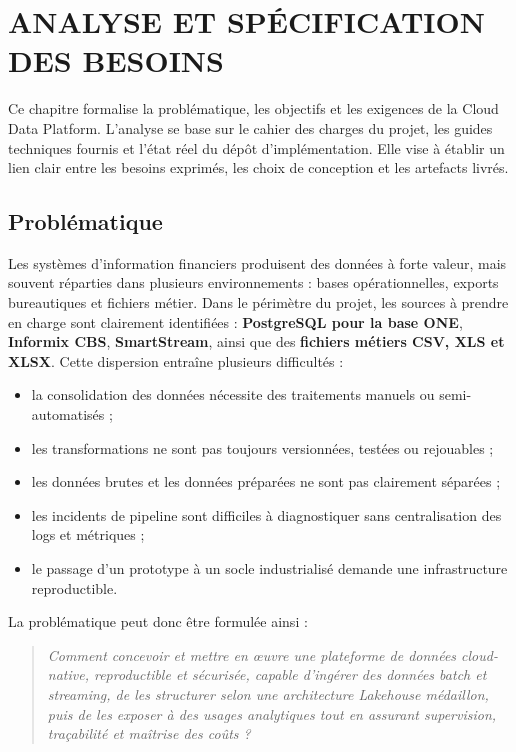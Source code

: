 \chapter{ANALYSE ET SPÉCIFICATION DES BESOINS}
\label{ch:besoins}

Ce chapitre formalise la problématique, les objectifs et les exigences de la Cloud Data Platform. L'analyse se base sur le cahier des charges du projet, les guides techniques fournis et l'état réel du dépôt d'implémentation. Elle vise à établir un lien clair entre les besoins exprimés, les choix de conception et les artefacts livrés.

\section{Problématique}

Les systèmes d'information financiers produisent des données à forte valeur, mais souvent réparties dans plusieurs environnements : bases opérationnelles, exports bureautiques et fichiers métier. Dans le périmètre du projet, les sources à prendre en charge sont clairement identifiées : \textbf{PostgreSQL pour la base ONE}, \textbf{Informix CBS}, \textbf{SmartStream}, ainsi que des \textbf{fichiers métiers CSV, XLS et XLSX}. Cette dispersion entraîne plusieurs difficultés :
\begin{itemize}
    \item la consolidation des données nécessite des traitements manuels ou semi-automatisés ;
    \item les transformations ne sont pas toujours versionnées, testées ou rejouables ;
    \item les données brutes et les données préparées ne sont pas clairement séparées ;
    \item les incidents de pipeline sont difficiles à diagnostiquer sans centralisation des logs et métriques ;
    \item le passage d'un prototype à un socle industrialisé demande une infrastructure reproductible.
\end{itemize}

La problématique peut donc être formulée ainsi :

\begin{quote}
\emph{Comment concevoir et mettre en œuvre une plateforme de données cloud-native, reproductible et sécurisée, capable d'ingérer des données batch et streaming, de les structurer selon une architecture Lakehouse médaillon, puis de les exposer à des usages analytiques tout en assurant supervision, traçabilité et maîtrise des coûts ?}
\end{quote}

